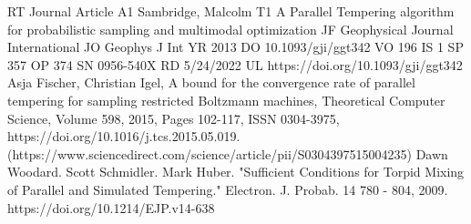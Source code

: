 \documentclass{amsart}
\newcommand{\1}{\mathbbm{1}}
\begin{document}
\begin{thebibliography}{9}
RT Journal Article
A1 Sambridge, Malcolm
T1 A Parallel Tempering algorithm for probabilistic sampling and multimodal optimization
JF Geophysical Journal International
JO Geophys J Int
YR 2013
DO 10.1093/gji/ggt342
VO 196
IS 1
SP 357
OP 374
SN 0956-540X
RD 5/24/2022
UL https://doi.org/10.1093/gji/ggt342
Asja Fischer, Christian Igel,
A bound for the convergence rate of parallel tempering for sampling restricted Boltzmann machines,
Theoretical Computer Science,
Volume 598,
2015,
Pages 102-117,
ISSN 0304-3975,
https://doi.org/10.1016/j.tcs.2015.05.019.
(https://www.sciencedirect.com/science/article/pii/S0304397515004235)
Dawn Woodard. Scott Schmidler. Mark Huber. "Sufficient Conditions for Torpid Mixing of Parallel and Simulated Tempering." Electron. J. Probab. 14 780 - 804, 2009. https://doi.org/10.1214/EJP.v14-638
\end{thebibliography}
\end{document}

